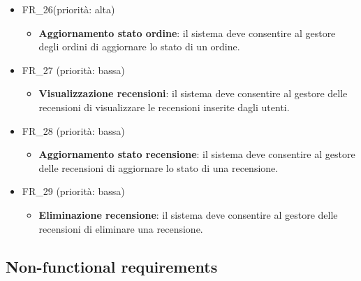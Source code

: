 \documentclass[12pt, a4paper, oneside]{book}
\begin{document}
\begin{itemize}
\begin{itemize}
                \end{itemize}
            \item FR\_26(priorità: alta)
               \begin{itemize}
                   \item \textbf{Aggiornamento stato ordine}: il sistema deve consentire al gestore degli ordini di aggiornare lo stato di un ordine.
                \end{itemize}
            \item FR\_27 (priorità: bassa)
               \begin{itemize}
                   \item \textbf{Visualizzazione recensioni}: il sistema deve consentire al gestore delle recensioni di visualizzare le recensioni inserite dagli utenti.
                \end{itemize}
            \item FR\_28 (priorità: bassa)
               \begin{itemize}
                   \item \textbf{Aggiornamento stato recensione}: il sistema deve consentire al gestore delle recensioni di aggiornare lo stato di una recensione.
                \end{itemize}
            \item FR\_29 (priorità: bassa)
               \begin{itemize}
                   \item \textbf{Eliminazione recensione}: il sistema deve consentire al gestore delle recensioni di eliminare una recensione.
                \end{itemize}
        \end{itemize} %


    \subsection*{Non-functional requirements }
\end{document}
